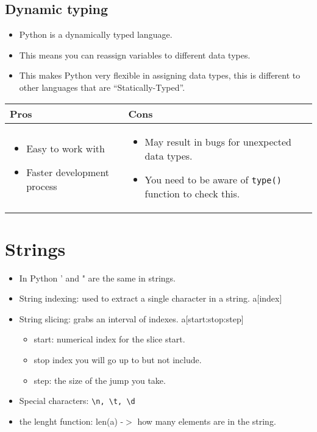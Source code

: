 \subsection{Dynamic typing}
\begin{itemize}
    \item Python is a dynamically typed language.
    \item This means you can reassign variables to different data types. 
    \item This makes Python very flexible in assigning data types, this is different to other languages that are ``Statically-Typed''.
\end{itemize}
\begin{center}
    \begin{tabular}{ |p{8.5cm}|p{8.5cm}| }
        \hline
            Pros & Cons \\
        \hline
            \begin{itemize}
                \item Easy to work with
                \item Faster development process 
            \end{itemize}
            & 
            \begin{itemize}
                \item May result in bugs for unexpected data types.
                \item You need to be aware of \verb|type()| function to check this. 
            \end{itemize}
            \\ 
        \hline
    \end{tabular}
\end{center}



\section{Strings}
\begin{itemize}
    \item In Python ' and " are the same in strings. 
    \item String indexing: used to extract a single character in a string. a[index] 
    \item String slicing: grabs an interval of indexes. a[start:stop:step]
        \begin{itemize}
            \item start: numerical index for the slice start. 
            \item stop index you will go up to but not include. 
            \item step: the size of the jump you take. 
        \end{itemize}
    
    \item Special characters: \verb|\n, \t, \d|
    \item the lenght function: len(a) -$>$ how many elements are in the string. 
\end{itemize}
